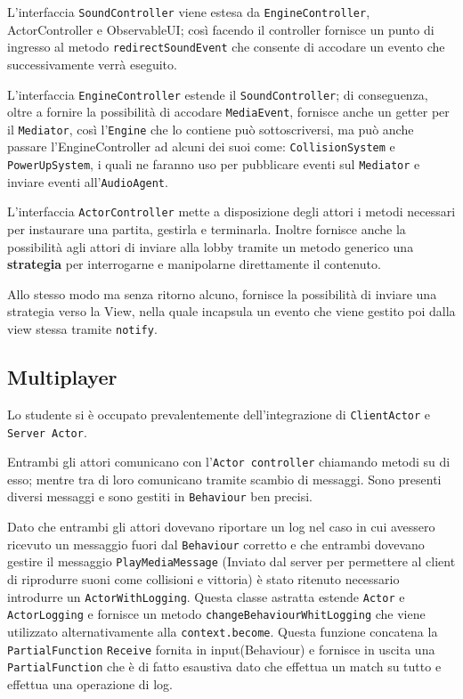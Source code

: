         L'interfaccia \texttt{SoundController} viene estesa da \texttt{EngineController}, ActorController e ObservableUI; così facendo il controller fornisce un punto di ingresso al metodo \texttt{redirectSoundEvent} che consente di accodare un evento che successivamente verrà eseguito.
        
        L'interfaccia \texttt{EngineController} estende il \texttt{SoundController}; di conseguenza, oltre a fornire la possibilità di accodare \texttt{MediaEvent}, fornisce anche un getter per il \texttt{Mediator}, così l'\texttt{Engine} che lo contiene può sottoscriversi, ma può anche passare l'EngineController ad alcuni dei suoi come:
        \texttt{CollisionSystem} e \texttt{PowerUpSystem}, i quali ne faranno uso per pubblicare eventi sul \texttt{Mediator} e inviare eventi all'\texttt{AudioAgent}.
        
        L'interfaccia \texttt{ActorController} mette a disposizione degli attori i metodi necessari per instaurare una partita, gestirla e terminarla.
        Inoltre fornisce anche la possibilità agli attori di inviare alla lobby tramite un metodo generico una \textbf{strategia} per interrogarne e manipolarne direttamente il contenuto.
        
        

        Allo stesso modo ma senza ritorno alcuno, fornisce la possibilità di inviare una strategia verso la View, nella quale incapsula un evento che viene gestito poi dalla view stessa tramite \texttt{notify}.  
        
        
    \subsection{Multiplayer}
    Lo studente si è occupato prevalentemente dell'integrazione di \texttt{ClientActor} e \texttt{Server Actor}.
    
    Entrambi gli attori comunicano con l'\texttt{Actor controller} chiamando metodi su di esso; mentre tra di loro comunicano tramite scambio di messaggi. Sono presenti diversi messaggi e sono gestiti in \texttt{Behaviour} ben precisi.
    
    Dato che entrambi gli attori dovevano riportare un log nel caso in cui avessero ricevuto un messaggio fuori dal \texttt{Behaviour} corretto e che entrambi dovevano gestire il messaggio \texttt{PlayMediaMessage} (Inviato dal server per permettere al client di riprodurre suoni come collisioni e vittoria) è stato ritenuto necessario introdurre un \texttt{ActorWithLogging}. Questa classe astratta estende \texttt{Actor} e \texttt{ActorLogging} e fornisce un metodo \texttt{changeBehaviourWhitLogging} che viene utilizzato alternativamente alla \texttt{context.become}. Questa funzione concatena la \texttt{PartialFunction} \texttt{Receive} fornita in input(Behaviour) e fornisce in uscita una \texttt{PartialFunction} che è di fatto esaustiva dato che effettua un match su tutto e 
    effettua una operazione di log.
    
